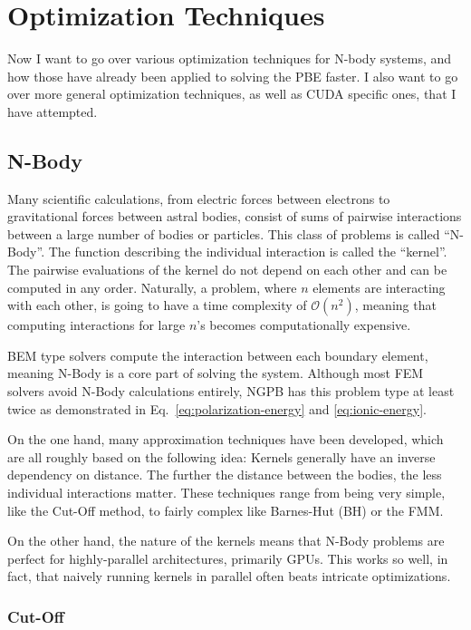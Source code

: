 \chapter{Optimization Techniques}
\label{sec:optimization-techniques}

Now I want to go over various optimization techniques for N-body systems, and how those have already been applied to solving the PBE faster.
I also want to go over more general optimization techniques, as well as CUDA specific ones, that I have attempted.

\section{N-Body}
\label{sec:optimization-techniques-nbody}
Many scientific calculations, from electric forces between electrons to gravitational forces between astral bodies, consist of sums of pairwise interactions between a large number of bodies or particles.
This class of problems is called ``N-Body''.
The function describing the individual interaction is called the ``kernel''.
The pairwise evaluations of the kernel do not depend on each other and can be computed in any order.
Naturally, a problem, where $n$ elements are interacting with each other, is going to have a time complexity of \(\mathcal{O}(n^2)\), meaning that computing interactions for large $n$'s becomes computationally expensive.

BEM type solvers compute the interaction between each boundary element, meaning N-Body is a core part of solving the system.
Although most FEM solvers avoid N-Body calculations entirely, NGPB has this problem type at least twice as demonstrated in Eq.~\eqref{eq:polarization-energy} and \ref{eq:ionic-energy}.

On the one hand, many approximation techniques have been developed, which are all roughly based on the following idea:
Kernels generally have an inverse dependency on distance.
The further the distance between the bodies, the less individual interactions matter.
These techniques range from being very simple, like the Cut-Off method, to fairly complex like Barnes-Hut (BH) or the FMM.

On the other hand, the nature of the kernels means that N-Body problems are perfect for highly-parallel architectures, primarily GPUs.
This works so well, in fact, that naively running kernels in parallel often beats intricate optimizations.

\subsection{Cut-Off}
\label{sec:optimization-techniques-nbody-cut-off}

